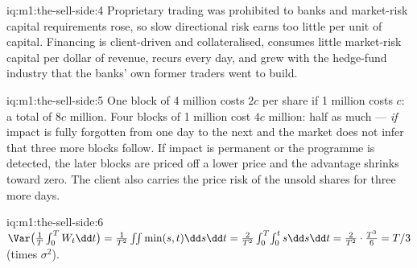 \begin{solution}{iq:m1:the-sell-side:4}
Proprietary trading was prohibited to banks and market-risk capital
requirements rose, so slow directional risk earns too little per unit of
capital. Financing is client-driven and collateralised, consumes little
market-risk capital per dollar of revenue, recurs every day, and grew with
the hedge-fund industry that the banks' own former traders went to build.
\end{solution}

\begin{solution}{iq:m1:the-sell-side:5}
One block of 4 million costs $2c$ per share if 1 million costs $c$: a total
of $8c$ million. Four blocks of 1 million cost $4c$ million: half as much
--- \emph{if} impact is fully forgotten from one day to the next and the
market does not infer that three more blocks follow. If impact is permanent
or the programme is detected, the later blocks are priced off a lower price
and the advantage shrinks toward zero. The client also carries the price
risk of the unsold shares for three more days.
\end{solution}

\begin{solution}{iq:m1:the-sell-side:6}
$\Var\bigl(\tfrac1T\int_0^T W_t\dd t\bigr) = \tfrac{1}{T^2}\iint
\min(s,t)\dd s\dd t = \tfrac{2}{T^2}\int_0^T\!\int_0^t s\dd s\dd t =
\tfrac{2}{T^2}\cdot\tfrac{T^3}{6} = T/3$ (times $\sigma^2$).
\end{solution}
